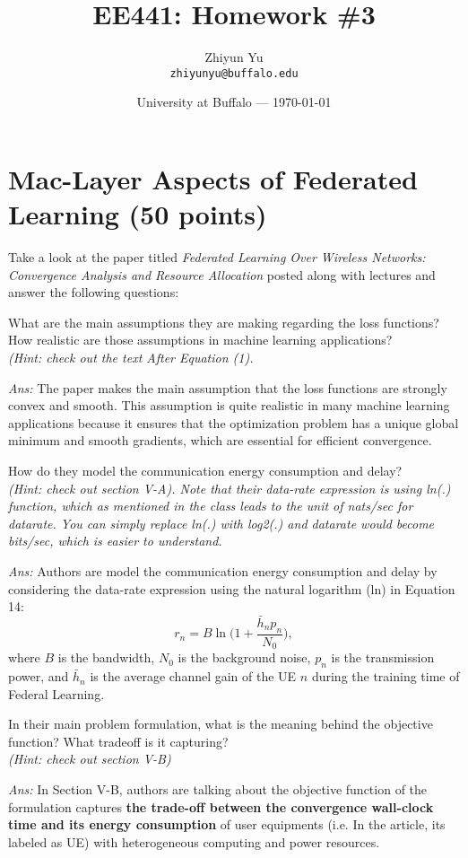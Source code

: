 \documentclass{article} %
\title{EE441: Homework \#3} %
\author{Zhiyun Yu\\ \texttt{zhiyunyu@buffalo.edu}} %
\date{University at Buffalo --- \today} %
\begin{document}
\maketitle %
\section{Mac-Layer Aspects of Federated Learning (50 points)}
Take a look at the paper titled \textit{Federated Learning Over Wireless Networks: Convergence
Analysis and Resource Allocation} posted along with lectures and answer the following questions:
\begin{question}
What are the main assumptions they are making regarding the loss functions? How
realistic are those assumptions in machine learning applications? \\ \textit{(Hint: check out the
text After Equation (1).}
\end{question}
\textit{Ans:} The paper makes the main assumption that the loss functions are strongly convex and smooth. This assumption is quite realistic in many machine learning applications because it ensures that the optimization problem has a unique global minimum and smooth gradients, which are essential for efficient convergence.

\begin{question}
How do they model the communication energy consumption and delay? \\ \textit{(Hint: check
out section V-A). Note that their data-rate expression is using ln(.) function, which as
mentioned in the class leads to the unit of nats/sec for datarate. You can simply replace
ln(.) with log2(.) and datarate would become bits/sec, which is easier to understand.}
\end{question}
\textit{Ans:} Authors are model the communication energy consumption and delay by considering the data-rate expression using the natural logarithm (ln) in Equation 14: 
$$r_n=B\ln\bigl(1+\frac{\bar{h}_np_n}{N_0}\bigr), $$
where $B$ is the bandwidth, $N_0$ is the background noise, $p_n$ is the transmission power, and $\bar{h}_n$ is the average channel gain of the UE $n$ during the training time of Federal Learning.

\begin{question}
In their main problem formulation, what is the meaning behind the objective function? What tradeoff is it capturing? \\ \textit{(Hint: check out section V-B)}
\end{question}
\textit{Ans:} In Section V-B, authors are talking about the objective function of the formulation captures \textbf {the trade-off between the convergence wall-clock time and its energy consumption} of user equipments (i.e. In the article, its labeled as UE) with heterogeneous computing and power resources. 
\end{document}
